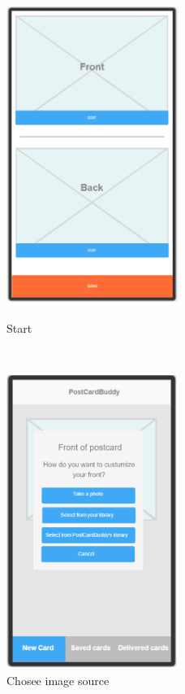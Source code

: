 \documentclass[10pt,a4paper]{article}
\begin{document}
\begin{figure}[p]
	\centering
	\begin{minipage}{0.5\textwidth}
		\centering
		\includegraphics[width=0.5\textwidth]{Prototype_img/p1.png}
		\caption{Start}
		\label{fig:p1}
	\end{minipage}~
	\begin{minipage}{0.5\textwidth}
		\centering
		\includegraphics[width=0.5\textwidth]{Prototype_img/p2.png}
		\caption{Chosee image source}

\end{minipage}
\end{figure}
\end{document}

